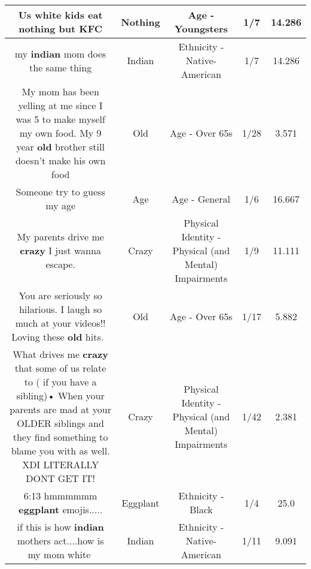 \documentclass[11pt]{article}
\newlength\mylength
\begin{document}
\begin{center}
\begin{longtable}{|C{.65\mylength}|C{.30\mylength}|C{.12\mylength}|C{.12\mylength}|C{.12\mylength}|}
  \small Us white kids eat \textbf{nothing} but KFC\normalsize   & Nothing & Age - Youngsters & 1/7 & 14.286 \\  \hline
  \small my \textbf{indian} mom does the same thing\normalsize   & Indian & Ethnicity - Native-American & 1/7 & 14.286 \\  \hline
  \small My mom has been yelling at me since I was 5 to make myself my own food. My 9 year \textbf{old} brother still doesn't make his own food\normalsize   & Old & Age - Over 65s & 1/28 & 3.571 \\  \hline
  \small Someone try to guess my age\normalsize   & Age & Age - General & 1/6 & 16.667 \\  \hline
  \small My parents drive me \textbf{crazy} I just wanna escape.\normalsize   & Crazy & Physical Identity - Physical (and Mental) Impairments & 1/9 & 11.111 \\  \hline
  \small You are seriously so hilarious. I laugh so much at your videos!! Loving these \textbf{old} hits. 🤣\normalsize   & Old & Age - Over 65s & 1/17 & 5.882 \\  \hline
  \small What drives me \textbf{crazy} that some of us relate to ( if you have a sibling)• When your parents are mad at your OLDER siblings and they find something to blame you with as well. XDI LITERALLY DONT GET IT!\normalsize   & Crazy & Physical Identity - Physical (and Mental) Impairments & 1/42 & 2.381 \\  \hline
  \small 6:13 hmmmmmm \textbf{eggplant} emojis.....\normalsize   & Eggplant & Ethnicity - Black & 1/4 & 25.0 \\  \hline
  \small if this is how \textbf{indian} mothers act....how is my mom white🤔\normalsize   & Indian & Ethnicity - Native-American & 1/11 & 9.091 \\  \hline

\end{longtable}
\end{center}
\end{document}
